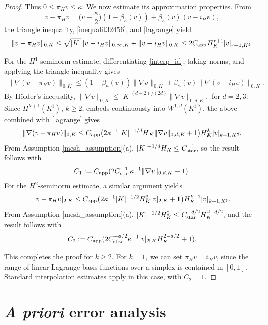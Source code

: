 \documentclass[11pt,final]{amsart}
\theoremstyle{plain}
\theoremstyle{definition}
\newcommand{\norm}[2]{\|{#1}\|_{{#2}}}
\renewcommand{\k}{K}
\newcommand{\ksh}{{K^{\sharp}}}
\begin{document}
\begin{proof}
Thus $0\le \pi_{H}v\le \kappa$. We now estimate its approximation properties. From
\begin{equation}\label{interp_id}
	v - 	\pi_{H}v = \Big( v - \frac{\kappa}{2} \Big)(1-\beta_\kappa(v))+\beta_\kappa(v) ( v -i_{H}v ),
\end{equation}
the triangle inequality, \eqref{inequalit32456}, and \eqref{lagrange} yield
\begin{equation}\label{bound345}
	\norm{v - \pi_{H}v}{0,K} 
	\leq \sqrt{|\k|}\|v -i_{H}v\|_{0,\infty,K} + \|v - i_{H}v\|_{0,K}
	\leq  2C_{\rm app} H_\k^{r+1}|v|_{r+1,\ksh}.
\end{equation}

For the $H^1$-seminorm estimate, differentiating \eqref{interp_id},
taking norms, and applying the triangle inequality gives
\begin{align}
	\norm{\nabla (v - 	\pi_{H}v)}{0,\k} \le (1-\beta_\kappa(v))\norm{\nabla v}{0,\k}+\beta_\kappa(v) \norm{\nabla( v -i_{H}v )}{0,\k}. 
\end{align}
By H\"older’s inequality, $ \norm{\nabla v}{0,\k}\le |\k|^{(d-2)/(2d)}
\norm{\nabla v}{0,d, \k}, $ for $d=2,3$. Since $H^{k+1}(\ksh)$, $k\ge
2$, embeds continuously into $W^{1,d}(\ksh)$, the above combined with
\eqref{lagrange} gives
\[
\norm{\nabla (v - 	\pi_{H}v)}{0,\k} 
\le C_{\rm app}\big(2\kappa^{-1}|\k|^{-1/d}H_\k\norm{\nabla v}{0,d, \k} +1\big) H_\k^{k}|v|_{k+1,\ksh}.
\]
From Assumption \ref{mesh_assumption}(a), $ |\k|^{-1/d}H_\k\le C_{\rm
  star}^{-1}, $ so the result follows with
\[
C_1:=C_{\rm app}(2C_{\rm star}^{-1}\kappa^{-1}\norm{\nabla v}{0,d, \k}
+1).
\]
For the $H^2$-seminorm estimate, a similar argument yields
\[
|v - 	\pi_{H}v|_{2,\k} 
\le C_{\rm app}\big(2\kappa^{-1}|\k|^{-1/2}H_\k^2| v|_{2,\k} +1\big) H_\k^{k-1}|v|_{k+1,\ksh}.
\]
From Assumption \ref{mesh_assumption}(a), $ |\k|^{-1/2}H_\k^2\le
C_{\rm star}^{-d/2}H_\k^{2-d/2}, $ and the result follows with
\[
C_2:=C_{\rm app}( 2C_{\rm star}^{-d/2}\kappa^{-1}|v|_{2,
  \k}H_\k^{2-d/2} +1).\]

This completes the proof for $k\ge 2$. For $k=1$, we can set
$\pi_Hv=i_Hv$, since the range of linear Lagrange basis functions over
a simplex is contained in $[0,1]$. Standard interpolation estimates
apply in this case, with $C_2=1$.
\end{proof}

\section{\emph{A priori} error analysis}\label{sec:Error}
\end{document}
